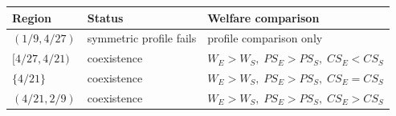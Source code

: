 \begin{tabular}{lll}
\hline
Region & Status & Welfare comparison \\
\hline
$(1/9,4/27)$ & symmetric profile fails & profile comparison only \\
$[4/27,4/21)$ & coexistence & $W_E>W_S,\;PS_E>PS_S,\;CS_E<CS_S$ \\
$\{4/21\}$ & coexistence & $W_E>W_S,\;PS_E>PS_S,\;CS_E=CS_S$ \\
$(4/21,2/9)$ & coexistence & $W_E>W_S,\;PS_E>PS_S,\;CS_E>CS_S$ \\
\hline
\end{tabular}
